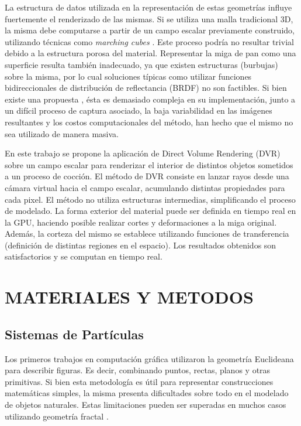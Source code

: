 \documentclass[oneside,a4paper,spanish,links]{amca}
\begin{document}
La estructura de datos utilizada en la representaci\'on de estas geometr\'ias influye fuertemente el renderizado de las mismas. Si se utiliza una malla tradicional 3D, la misma debe computarse a partir de un campo escalar previamente construido, utilizando t\'ecnicas como 
{\em marching cubes} \citep{Lorensen1987}. Este proceso podr\'ia no resultar trivial debido a la estructura porosa del material. Representar la miga de pan como una superficie resulta tambi\'en inadecuado, ya que existen estructuras (burbujas) sobre la misma, por lo cual soluciones t\'ipicas como utilizar funciones bidireccionales de distribuci\'on de reflectancia (BRDF) \citep{Kurt2009} no son factibles. Si bien existe una propuesta \citep{Tong2005}, ésta es demasiado compleja en su implementación, junto a un difícil proceso de captura asociado, la baja variabilidad en las im\'agenes resultantes y los costos computacionales del m\'etodo, han hecho que el mismo no sea utilizado de manera masiva. 

En este trabajo se propone la aplicaci\'on de Direct Volume Rendering (DVR) \citep{Levoy1988, Kratz2006} sobre un campo escalar para renderizar el interior de distintos objetos sometidos a un proceso de cocción. El método de DVR consiste en lanzar rayos desde una c\'amara virtual hacia el campo escalar, acumulando distintas propiedades para cada pixel. El m\'etodo no utiliza estructuras intermedias, simplificando el proceso de modelado. La forma exterior del material puede ser definida en tiempo real en la GPU, haciendo posible realizar cortes y deformaciones a la miga original. Adem\'as, la corteza del mismo se establece utilizando funciones de transferencia (definici\'on de distintas regiones en el espacio). Los resultados obtenidos son satisfactorios y se computan en tiempo real.

\section{MATERIALES Y METODOS}

\subsection{Sistemas de Part\'iculas}

Los primeros trabajos en computaci\'on gr\'afica utilizaron la geometr\'ia Euclideana para describir figuras. Es decir, combinando puntos, rectas, planos y otras primitivas. Si bien esta metodolog\'ia es \'util para representar construcciones matem\'aticas simples, la misma presenta dificultades sobre todo en el modelado de objetos naturales. Estas limitaciones pueden ser superadas en muchos casos utilizando geometría fractal \citep{Mandelbrot83}.
\end{document}
